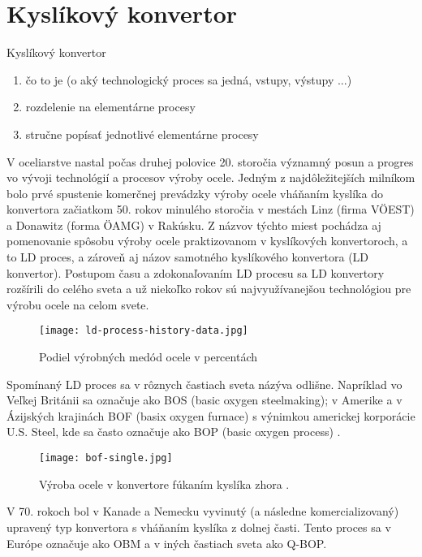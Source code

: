 \section{Kyslíkový konvertor}

Kyslíkový konvertor
\begin{enumerate}
\item{čo to je (o aký technologický proces sa jedná, vstupy, výstupy ...)}
\item{rozdelenie na elementárne procesy}
\item{stručne popísať jednotlivé elementárne procesy}
\end{enumerate}

V oceliarstve nastal počas druhej polovice 20. storočia významný posun a progres vo vývoji technológií a procesov výroby ocele. Jedným z najdôležitejších milníkom bolo prvé spustenie komerčnej prevádzky výroby ocele vháňaním kyslíka do konvertora začiatkom 50. rokov minulého storočia v mestách Linz (firma VÖEST) a Donawitz (forma ÖAMG) v Rakúsku. Z názvov týchto miest pochádza aj pomenovanie spôsobu výroby ocele praktizovanom v kyslíkových konvertoroch, a to LD proces, a zároveň aj názov samotného kyslíkového konvertora (LD konvertor). Postupom času a zdokonaľovaním LD procesu sa LD konvertory rozšírili do celého sveta a už niekoľko rokov sú najvyužívanejšou technológiou pre výrobu ocele na celom svete.

\begin{figure}
\centering
\texttt{[image: ld-process-history-data.jpg]}
\caption{Podiel výrobných medód ocele v percentách \citep{voestalpineLD2012}}
\label{o:1}
\end{figure}

Spomínaný LD proces sa v rôznych častiach sveta názýva odlišne. Napríklad vo Veľkej Británii sa označuje ako BOS (basic oxygen steelmaking); v Amerike a v Ázijských krajinách BOF (basix oxygen furnace) s výnimkou americkej korporácie U.S. Steel, kde sa často označuje ako BOP (basic oxygen process) \citep{Turkdogan1996}.

\begin{figure}
\centering
\texttt{[image: bof-single.jpg]}
\caption{Výroba ocele v konvertore fúkaním kyslíka zhora \citep{Turkdogan1996}.}
\label{o:2}
\end{figure}

V 70. rokoch bol v Kanade a Nemecku vyvinutý (a následne komercializovaný) upravený typ konvertora s vháňaním kyslíka z dolnej časti. Tento proces sa v Európe označuje ako OBM a v iných častiach sveta ako Q-BOP.

